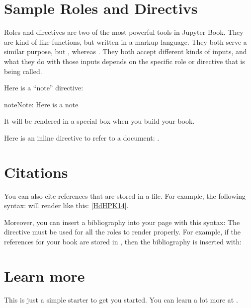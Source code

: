 \documentclass[letterpaper,10pt,english]{jupyterBook}
\begin{document}
\section{Sample Roles and Directivs}
\label{\detokenize{markdown:sample-roles-and-directivs}}
\sphinxAtStartPar
Roles and directives are two of the most powerful tools in Jupyter Book. They
are kind of like functions, but written in a markup language. They both
serve a similar purpose, but , whereas
. They both accept different kinds of inputs,
and what they do with those inputs depends on the specific role or directive
that is being called.

\sphinxAtStartPar
Here is a “note” directive:

\begin{sphinxadmonition}{note}{Note:}
\sphinxAtStartPar
Here is a note
\end{sphinxadmonition}

\sphinxAtStartPar
It will be rendered in a special box when you build your book.

\sphinxAtStartPar
Here is an inline directive to refer to a document: {\hyperref[\detokenize{markdown-notebooks::doc}]{}}.


\section{Citations}
\label{\detokenize{markdown:citations}}
\sphinxAtStartPar
You can also cite references that are stored in a  file. For example,
the following syntax:  will render like
this: {[}\hyperlink{cite.markdown:id3}{HdHPK14}{]}.

\sphinxAtStartPar
Moreover, you can insert a bibliography into your page with this syntax:
The  directive must be used for all the  roles to
render properly.
For example, if the references for your book are stored in ,
then the bibliography is inserted with:

\sphinxAtStartPar



\section{Learn more}
\label{\detokenize{markdown:learn-more}}
\sphinxAtStartPar
This is just a simple starter to get you started.
You can learn a lot more at .
\end{document}
